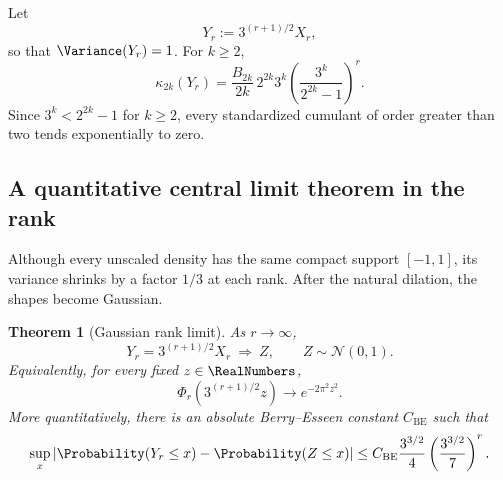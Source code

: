 \documentclass[11pt,oneside]{article}
\newtheorem{theorem}{Theorem}[section]
\theoremstyle{definition}
\theoremstyle{remark}
\begin{document}
\begin{corollary}\label{p3:cor:standard-cumulants}
Let
\begin{equation}\label{p3:eq:Yr}
  Y_r:=3^{(r+1)/2}X_r,
\end{equation}
so that $\Variance(Y_r)=1$.  For $k\ge2$,
\begin{equation}\label{p3:eq:standard-cumulants}
 \kappa_{2k}(Y_r)
 =\frac{B_{2k}}{2k}\,2^{2k}3^k
  \left(\frac{3^k}{2^{2k}-1}\right)^r.
\end{equation}
Since $3^k<2^{2k}-1$ for $k\ge2$, every standardized cumulant of order greater than two tends exponentially to zero.
\end{corollary}

\subsection{A quantitative central limit theorem in the rank}

Although every unscaled density has the same compact support $[-1,1]$, its variance shrinks by a factor $1/3$ at each rank.  After the natural dilation, the shapes become Gaussian.

\begin{theorem}[Gaussian rank limit]\label{p3:thm:gaussian-limit}
As $r\to\infty$,
\begin{equation}\label{p3:eq:gaussian-limit}
  Y_r=3^{(r+1)/2}X_r\ \Longrightarrow\ Z,
  \qquad Z\sim\mathcal N(0,1).
\end{equation}
Equivalently, for every fixed $z\in\RealNumbers$,
\begin{equation}\label{p3:eq:gaussian-fourier-limit}
  \Phi_r\!\left(3^{(r+1)/2}z\right)
  \longrightarrow e^{-2\pi^2z^2}.
\end{equation}
More quantitatively, there is an absolute Berry--Esseen constant $C_{\mathrm{BE}}$ such that
\begin{equation}\label{p3:eq:berry-esseen-r}
 \sup_x\left|\Probability(Y_r\le x)-\Probability(Z\le x)\right|
 \le C_{\mathrm{BE}}\frac{3^{3/2}}4
 \left(\frac{3^{3/2}}7\right)^r.
\end{equation}
\end{theorem}
\end{document}
